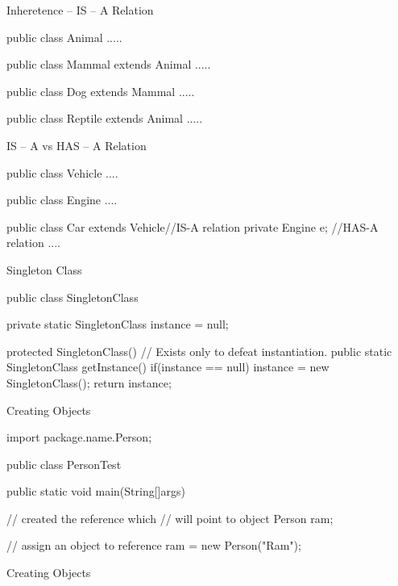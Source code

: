 \documentclass[11pt]{beamer}
\begin{document}
\begin{frame}[containsverbatim]{Inheretence -- IS -- A Relation}
\begin{java}
public class Animal{
	.....
}

  public class Mammal extends Animal{
  	.....
  }

    public class Dog extends Mammal{
    		.....
    }

  public class Reptile extends Animal{
  	.....
  }
\end{java}
\end{frame}


\begin{frame}[containsverbatim]{IS -- A vs HAS -- A Relation}
\begin{java}

public class Vehicle{
  ....
}

public class Engine{
  ....
}

public class Car extends Vehicle{//IS-A relation
  private Engine e;  //HAS-A relation
  ....
}
\end{java}
\end{frame}



\begin{frame}[containsverbatim]{Singleton Class}
\begin{java}
public class SingletonClass{
private static SingletonClass instance = null;
	
	protected SingletonClass(){
		// Exists only to defeat instantiation.
	}
	public static SingletonClass getInstance(){
		if(instance == null){
			instance = new SingletonClass();
		}
		return instance;
	}
}
\end{java}
\end{frame}

\begin{frame}[containsverbatim]{Creating Objects}
\begin{java}
import package.name.Person;

public class PersonTest{

	public static void main(String[]args){
	
		// created the reference which 
		// will point to object
		Person ram;
		
		// assign an object to reference
		ram = new Person("Ram");
	}
}
\end{java}
\end{frame}

\begin{frame}[containsverbatim]{Creating Objects}
\begin{java}

\end{java}
\end{frame}
\end{document}
